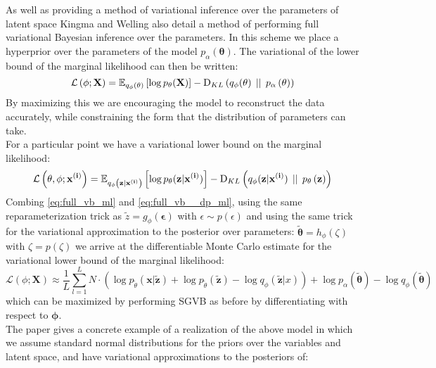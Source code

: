 \documentclass[../report.tex]{subfiles}
\begin{document}
As well as providing a method of variational inference over the parameters of latent space Kingma and Welling also detail a method of performing full variational Bayesian inference over the parameters. In this scheme we place a hyperprior over the parameters of the model $p_\alpha(\mathbf{\theta})$. The variational of the lower bound of the marginal likelihood can then be written:
\begin{equation}
\mathcal{L} \left( \mathbf{\phi}; \mathbf{X}\right)=\mathbb{E}_{q_\phi \left( \theta\right)} \left[ \log p_\mathbf{\theta}(\mathbf{X}) \right] - \textrm{D}_{KL} \left( q_\phi(\mathbf{\theta}) \, \mid \mid \, p_\mathbf{\alpha} \left( \mathbf{\theta}\right)\right)
\label{eq:full_vb_ml}
\end{equation}
By maximizing this we are encouraging the model to reconstruct the data accurately, while constraining the form that the distribution of parameters can take.\\
For a particular point we have a variational lower bound on the marginal likelihood:
\begin{equation}
\mathcal{L} \left( \mathbf{\theta}, \mathbf{\phi}; \mathbf{x^{(i)}}\right) =\mathbb{E}_{q_\phi \left( \mathbf{z} | \mathbf{x^{(i)}}\right)} \left[ \log p_\mathbf{\theta}(\mathbf{z} | \mathbf{x^{(i)}}) \right] - \textrm{D}_{KL} \left( q_\phi(\mathbf{z} | \mathbf{x^{(i)}}) \, \mid \mid \, p_\mathbf{\theta} \left( \mathbf{z}\right)\right)
\label{eq:full_vb__dp_ml}
\end{equation}
Combing \cref{eq:full_vb_ml} and \cref{eq:full_vb__dp_ml}, using the same reparameterization trick as $\tilde{z}=g_{\phi}(\mathbf{\epsilon})$ with $\epsilon \sim p(\epsilon)$ and using the same trick for the variational approximation to the posterior over parameters: $\tilde{\mathbf{\theta}} = h_\phi(\zeta)$ with $\zeta = p(\zeta)$ we arrive at the differentiable Monte Carlo estimate for the variational lower bound of the marginal likelihood:
\begin{equation}
\mathcal{L}(\phi; \mathbf{X}) \approx \frac{1}{L}\sum_{l=1}^{L} N\cdot(\log p_{\tilde{\theta}}(\mathbf{x} | \mathbf{\tilde{z}})
 + \log p_{\tilde{\theta}}(\tilde{\mathbf{z}}) - 
 \log q_\phi(\mathbf{\tilde{z}} | x)) + \log p_\alpha(\mathbf{\tilde{\theta}}) - \log q_\phi(\mathbf{\tilde{\theta}})
 \label{eq:fvb_mc_approx}
\end{equation}
which can be maximized by performing SGVB as before by differentiating with respect to $\mathbf{\phi}$.\\
The paper gives a concrete example of a realization of the above model in which we assume standard normal distributions for the priors over the variables and latent space, and have variational approximations to the posteriors of:
\end{document}
